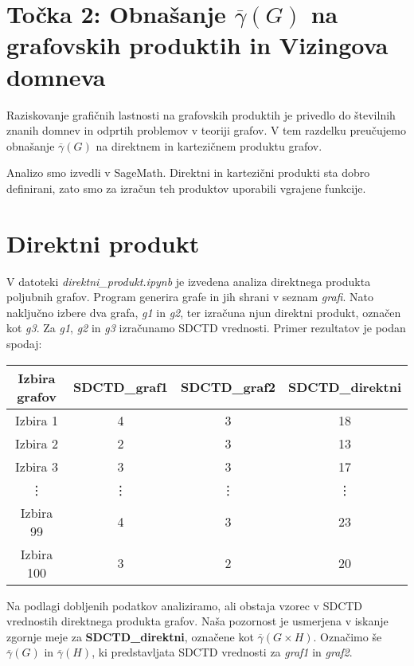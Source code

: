 \documentclass[a4paper, 12pt]{article}
\begin{document}
\section*{Točka 2: Obnašanje $\overline{\gamma}(G)$ na grafovskih produktih in Vizingova domneva}

Raziskovanje grafičnih lastnosti na grafovskih produktih je privedlo do številnih znanih domnev in odprtih problemov v teoriji grafov. V tem razdelku preučujemo obnašanje $\overline\gamma(G)$ na direktnem in kartezičnem produktu grafov.
\vspace{6pt}

\noindent Analizo smo izvedli v SageMath. Direktni in kartezični produkti sta dobro definirani, zato smo za izračun teh produktov uporabili vgrajene funkcije. 
\section*{Direktni produkt}

V datoteki \textit{direktni\_produkt.ipynb} je izvedena analiza direktnega produkta poljubnih grafov. Program generira grafe in jih shrani v seznam \textit{grafi}. Nato naključno izbere dva grafa, \textit{g1} in \textit{g2}, ter izračuna njun direktni produkt, označen kot \textit{g3}. Za \textit{g1}, \textit{g2} in \textit{g3} izračunamo SDCTD vrednosti. Primer  rezultatov je podan spodaj:

\begin{table}[h!]
\centering
\begin{tabular}{|c|c|c|c|}
\hline
\textbf{Izbira grafov} & \textbf{SDCTD\_graf1} & \textbf{SDCTD\_graf2} & \textbf{SDCTD\_direktni} \\ \hline
Izbira 1   & 4 & 3 & 18 \\ \hline
Izbira 2   & 2 & 3 & 13 \\ \hline
Izbira 3   & 3 & 3 & 17 \\ \hline
\vdots     & \vdots & \vdots & \vdots \\ \hline
Izbira 99  & 4 & 3 & 23 \\ \hline
Izbira 100 & 3 & 2 & 20 \\ \hline
\end{tabular}
\label{tab:sdctd-results}
\end{table}

\noindent Na podlagi dobljenih podatkov analiziramo, ali obstaja vzorec v SDCTD vrednostih direktnega produkta grafov. Naša pozornost je usmerjena v iskanje zgornje meje za \textbf{SDCTD\_direktni}, označene kot \(\overline{\gamma}(G \times H)\). Označimo še \(\overline{\gamma}(G)\) in \(\overline{\gamma}(H)\), ki predstavljata SDCTD vrednosti za \textit{graf1} in \textit{graf2}. \\
\end{document}
